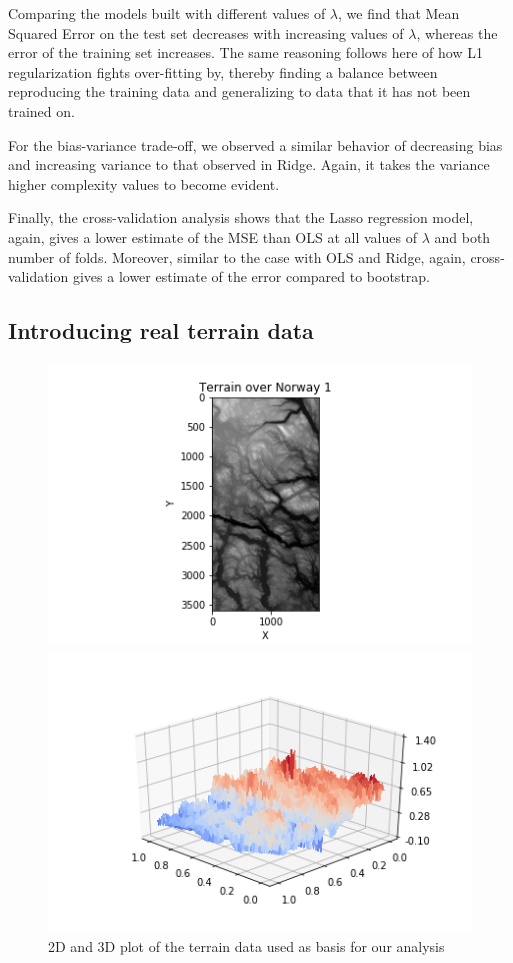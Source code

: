 \documentclass{article}
\begin{document}
Comparing the models built with different values of $\lambda$, we find that Mean Squared Error on the test set decreases with increasing values of $\lambda$, whereas the error of the training set increases. The same reasoning follows here of how L1 regularization fights over-fitting by, thereby finding a balance between reproducing the training data and generalizing to data that it has not been trained on.

For the bias-variance trade-off, we observed a similar behavior of decreasing bias and increasing variance to that observed in Ridge. Again, it takes the variance higher complexity values to become evident.

Finally, the cross-validation analysis shows that the Lasso regression model, again, gives a lower estimate of the MSE than OLS at all values of $\lambda$ and both number of folds. Moreover, similar to the case with OLS and Ridge, again, cross-validation gives a lower estimate of the error compared to bootstrap.


\subsection{Introducing real terrain data}
\begin{figure}
\begin{minipage}{0.48\textwidth}
\centering
\includegraphics[width=1.5\linewidth]{terrain2dplot.png}
\end{minipage}
\begin{minipage}{\textwidth}

\includegraphics[width=0.7\linewidth]{rawdataplot.png}
\end{minipage}
\caption{2D and 3D plot of the terrain data used as basis for our analysis}
\end{figure}
\end{document}
